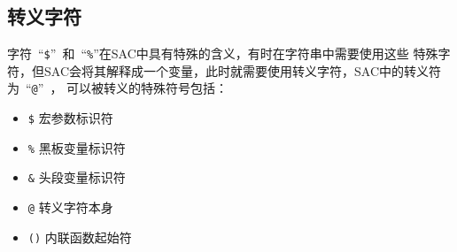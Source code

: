 \subsection{转义字符}
字符~``\lstinline{$}''~和~``\lstinline{%}''在SAC中具有特殊的含义，有时在字符串中需要使用这些
特殊字符，但SAC会将其解释成一个变量，此时就需要使用转义字符，SAC中的转义符为~``\lstinline{@}''~，
可以被转义的特殊符号包括：
\begin{itemize}
    \item \lstinline{$}  宏参数标识符
    \item \lstinline{%}  黑板变量标识符
    \item \lstinline{&}  头段变量标识符
    \item \lstinline{@}  转义字符本身
    \item \lstinline{()}  内联函数起始符
\end{itemize}
